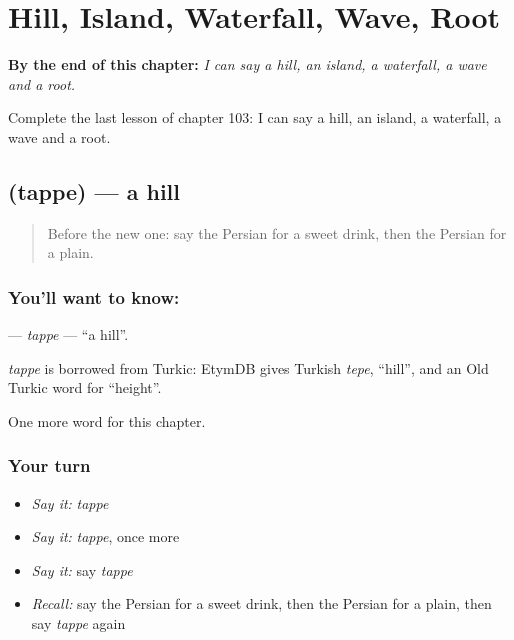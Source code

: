 
\chapter{Hill, Island, Waterfall, Wave, Root}
\label{ch:fa-hill-island-waterfall-wave-root}

\begin{chapteropening}
\textbf{By the end of this chapter:} \emph{I can say a hill, an island, a waterfall, a wave and a root.}

Complete the last lesson of chapter 103: I can say a hill, an island, a waterfall, a wave and a root.
\end{chapteropening}

\section[\texorpdfstring{\fa{تپه} (tappe)}{تپه (tappe)}]{ (tappe) — a hill}

\label{lesson:FA-C103-tappe}



\begin{quote}
Before the new one: say the Persian for a sweet drink, then the Persian for a plain.
\end{quote}

\subsection*{You'll want to know: }
\textbf{} — \emph{tappe} — \textquotedblleft{}a hill\textquotedblright{}.

\begin{cousinweb}
\emph{tappe} is borrowed from Turkic: EtymDB gives Turkish \emph{tepe}, \textquotedblleft{}hill\textquotedblright{}, and an Old Turkic word for \textquotedblleft{}height\textquotedblright{}.
\end{cousinweb}

\begin{grammarlens}[title={What you've built}]
One more word for this chapter.
\end{grammarlens}

\subsection*{Your turn}
\begin{itemize}
\raggedright
  \item \emph{Say it:} \emph{tappe}
  \item \emph{Say it:} \emph{tappe}, once more
  \item \emph{Say it:} say \emph{tappe}
  \item \emph{Recall:} say the Persian for a sweet drink, then the Persian for a plain, then say \emph{tappe} again
\end{itemize}

